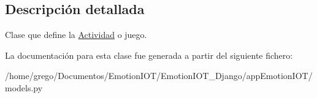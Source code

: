 \subsection{Descripción detallada}
Clase que define la \hyperlink{classappEmotionIOT_1_1models_1_1Actividad}{Actividad} o juego. 

La documentación para esta clase fue generada a partir del siguiente fichero\+:\begin{DoxyCompactItemize}
\item 
/home/grego/\+Documentos/\+Emotion\+I\+O\+T/\+Emotion\+I\+O\+T\+\_\+\+Django/app\+Emotion\+I\+O\+T/models.\+py\end{DoxyCompactItemize}
